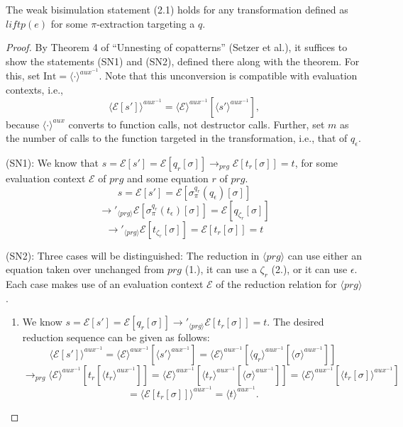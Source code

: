 \begin{proposition}
\label{prop:bisim1}
The weak bisimulation statement (2.1) holds for any transformation defined as $liftp(e)$ for some $\pi$-extraction targeting a $q$.

\begin{proof}
By Theorem 4 of ``Unnesting of copatterns'' (Setzer et al.), it suffices to show the statements (SN1) and (SN2), defined there along with the theorem. For this, set $\textrm{Int} = \langle \cdot \rangle^{aux^{-1}}$. Note that this unconversion is compatible with evaluation contexts, i.e.,
\[
\langle \mathcal{E}[s'] \rangle^{aux^{-1}} = \langle \mathcal{E} \rangle^{aux^{-1}}[\langle s' \rangle^{aux^{-1}}],
\]
because $\langle \cdot \rangle^{aux}$ converts to function calls, not destructor calls.
Further, set $m$ as the number of calls to the function targeted in the transformation, i.e., that of $q_\epsilon$.

(SN1): We know that $s = \mathcal{E}[s'] = \mathcal{E}[q_r[\sigma]] \longrightarrow_{prg} \mathcal{E}[t_r[\sigma]] = t$, for some evaluation context $\mathcal{E}$ of $prg$ and some equation $r$ of $prg$.
\[
s = \mathcal{E}[s'] = \mathcal{E}[\sigma^{q_r}_\pi(q_\epsilon)[\sigma]]
\]
\[
\longrightarrow'_{\langle prg \rangle} \mathcal{E}[\sigma^{q_r}_\pi(t_\epsilon)[\sigma]] = \mathcal{E}[q_{\zeta_r}[\sigma]]
\]
\[
\longrightarrow'_{\langle prg \rangle} \mathcal{E}[t_{\zeta_r}[\sigma]] = \mathcal{E}[t_r[\sigma]] = t
\]

(SN2): Three cases will be distinguished: The reduction in $\langle prg \rangle$ can use either an equation taken over unchanged from $prg$ (1.), it can use a $\zeta_r$ (2.), or it can use $\epsilon$. Each case makes use of an evaluation context $\mathcal{E}$ of the reduction relation for $\langle prg \rangle$.
\begin{enumerate}
\item We know $s = \mathcal{E}[s'] = \mathcal{E}[q_r[\sigma]] \longrightarrow'_{\langle prg \rangle} \mathcal{E}[t_r[\sigma]] = t$. The desired reduction sequence can be given as follows:
\[
\langle \mathcal{E}[s'] \rangle^{aux^{-1}} = \langle \mathcal{E} \rangle^{aux^{-1}}[\langle s' \rangle^{aux^{-1}}] = \langle \mathcal{E} \rangle^{aux^{-1}}[\langle q_r \rangle^{aux^{-1}}[\langle \sigma \rangle^{aux^{-1}}]]
\]
\[
 \longrightarrow_{prg} \langle \mathcal{E} \rangle^{aux^{-1}}[t_r[\langle t_r \rangle^{aux^{-1}}]] = \langle \mathcal{E} \rangle^{aux^{-1}}[\langle t_r \rangle^{aux^{-1}}[\langle \sigma \rangle^{aux^{-1}}]] = \langle \mathcal{E} \rangle^{aux^{-1}}[\langle t_r[\sigma] \rangle^{aux^{-1}}]
\]
\[
= \langle \mathcal{E}[t_r[\sigma]] \rangle^{aux^{-1}} = \langle t \rangle^{aux^{-1}}.
\]


\end{enumerate}
\end{proof}
\end{proposition}
